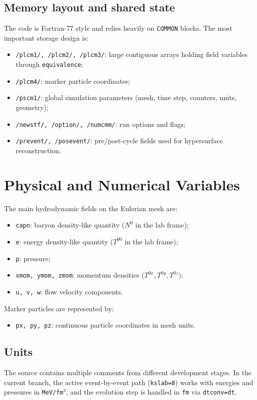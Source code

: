 \documentclass[11pt,a4paper]{article}
\begin{document}
\subsection{Memory layout and shared state}
The code is Fortran-77 style and relies heavily on \texttt{COMMON} blocks.
The most important storage design is:
\begin{itemize}
\item \texttt{/plcm1/, /plcm2/, /plcm3/}: large contiguous arrays holding field
      variables through \texttt{equivalence};
\item \texttt{/plcm4/}: marker particle coordinates;
\item \texttt{/pscm1/}: global simulation parameters (mesh, time step, counters,
      units, geometry);
\item \texttt{/newstf/, /option/, /numcmm/}: run options and flags;
\item \texttt{/prevent/, /posevent/}: pre/post-cycle fields used for hypersurface
      reconstruction.
\end{itemize}

\section{Physical and Numerical Variables}
The main hydrodynamic fields on the Eulerian mesh are:
\begin{itemize}
\item \texttt{capn}: baryon density-like quantity ($N^0$ in the lab frame);
\item \texttt{e}: energy density-like quantity ($T^{00}$ in the lab frame);
\item \texttt{p}: pressure;
\item \texttt{xmom, ymom, zmom}: momentum densities ($T^{0x},T^{0y},T^{0z}$);
\item \texttt{u, v, w}: flow velocity components.
\end{itemize}

Marker particles are represented by:
\begin{itemize}
\item \texttt{px, py, pz}: continuous particle coordinates in mesh units.
\end{itemize}

\subsection{Units}
The source contains multiple comments from different development stages.
In the current branch, the active event-by-event path (\texttt{kslab=8})
works with energies and pressures in \texttt{MeV/fm$^3$}, and the evolution
step is handled in \texttt{fm} via \texttt{dtconv=dt}.
\end{document}
